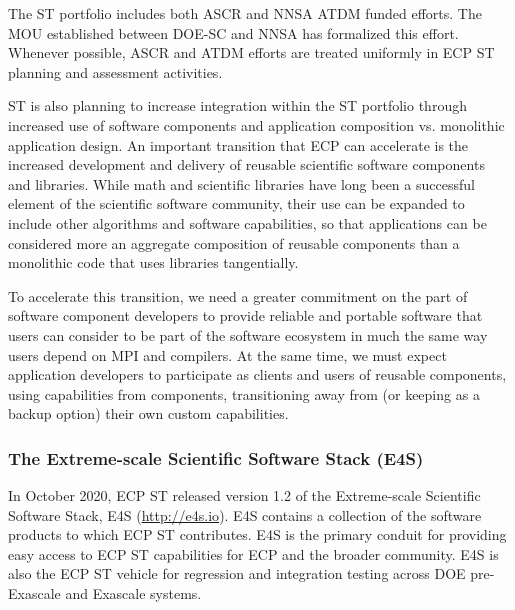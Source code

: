 The ST portfolio includes both ASCR and NNSA ATDM funded efforts. The MOU established between DOE-SC and NNSA has formalized this effort.  Whenever possible, ASCR and ATDM efforts are treated uniformly in ECP ST planning and assessment activities.

ST is also planning to increase integration within the ST portfolio through increased use of software components and application composition vs. monolithic application design. An important transition that ECP can accelerate is the increased development and delivery of reusable scientific software components and libraries. While math and scientific libraries have long been a successful element of the scientific software community, their use can be expanded to include other algorithms and software capabilities, so that applications can be considered more an aggregate composition of reusable components than a monolithic code that uses libraries tangentially.

To accelerate this transition, we need a greater commitment on the part of software component developers to provide reliable and portable software that users can consider to be part of the software ecosystem in much the same way users depend on MPI and compilers. At the same time, we must expect application developers to participate as clients and users of reusable components, using capabilities from components, transitioning away from (or keeping as a backup option) their own custom capabilities.

\subsubsection{The Extreme-scale Scientific Software Stack (E4S)}\label{subsubsect:e4s}
In October 2020, ECP ST released version 1.2 of the Extreme-scale Scientific Software Stack, E4S (\url{http://e4s.io}). E4S contains a collection of the software products to which ECP ST contributes.  E4S is the primary conduit for providing easy access to ECP ST capabilities for ECP and the broader community.  E4S is also the ECP ST vehicle for regression and integration testing across DOE pre-Exascale and Exascale systems.

